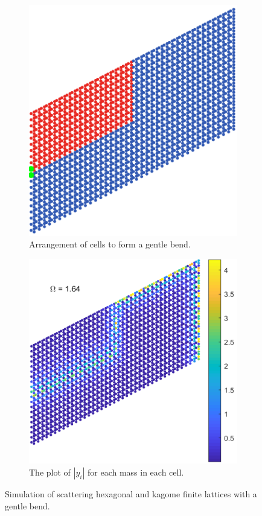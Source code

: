 \begin{figure}[!h]
\medskip
\centering
\begin{subfigure}[b]{.5\textwidth}
  \centering
  \includegraphics[width=0.8\linewidth]{imgs/kagomegentlebendarr.png}
  \caption{Arrangement of cells to form a gentle bend.}
  \label{fig:sub1}
\end{subfigure}%
\begin{subfigure}[b]{.5\textwidth}
  \centering
  \includegraphics[width=1\linewidth]{imgs/kagomegentlebendscat.png}
  \caption{The plot of $|y_i|$ for each mass in each cell.}
  \label{fig:kagomegentlebendscat}
\end{subfigure}
\caption{Simulation of scattering hexagonal and kagome finite lattices with a
  gentle bend.}
\label{fig:gentlebend}
\end{figure}

